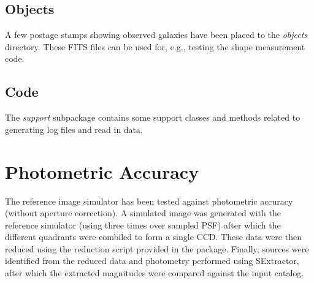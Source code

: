 \documentclass[a4paper,11pt,english]{sphinxmanual}
\begin{document}
\section{Objects}
\label{index:objects}
A few postage stamps showing observed galaxies have been placed to the \emph{objects} directory. These FITS files
can be used for, e.g., testing the shape measurement code.


\section{Code}
\label{index:code}
The \emph{support} subpackage contains some support classes and methods related to generating log files and read in
data.


\chapter{Photometric Accuracy}
\label{index:photometric-accuracy}
The reference image simulator has been tested against photometric accuracy (without aperture correction). A
simulated image was generated with the reference simulator (using three times over sampled PSF) after
which the different quadrants were combiled to form a single CCD. These data were then reduced using the
reduction script provided in the package. Finally, sources were identified from the reduced data and photometry performed
using SExtractor, after which the extracted magnitudes were compared against the input catalog.
\end{document}
